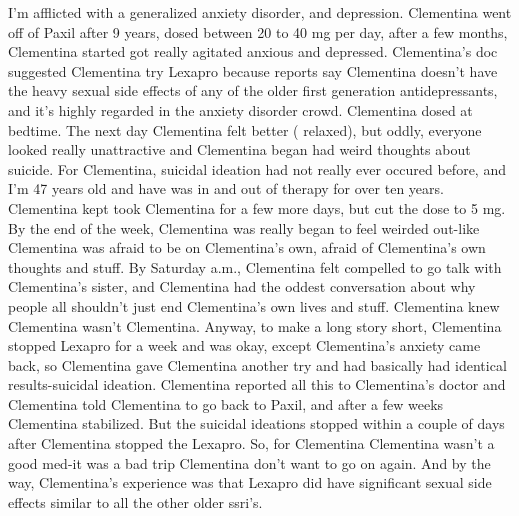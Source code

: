 \documentclass[12pt]{book}
\begin{document}
I'm afflicted with a generalized anxiety disorder, and depression. Clementina went off of Paxil after 9 years, dosed between 20 to 40 mg per day, after a few months, Clementina started got really agitated anxious and depressed. Clementina's doc suggested Clementina try Lexapro because reports say Clementina doesn't have the heavy sexual side effects of any of the older first generation antidepressants, and it's highly regarded in the anxiety disorder crowd. Clementina dosed at bedtime. The next day Clementina felt better ( relaxed), but oddly, everyone looked really unattractive and Clementina began had weird thoughts about suicide. For Clementina, suicidal ideation had not really ever occured before, and I'm 47 years old and have was in and out of therapy for over ten years. Clementina kept took Clementina for a few more days, but cut the dose to 5 mg. By the end of the week, Clementina was really began to feel weirded out-like Clementina was afraid to be on Clementina's own, afraid of Clementina's own thoughts and stuff. By Saturday a.m., Clementina felt compelled to go talk with Clementina's sister, and Clementina had the oddest conversation about why people all shouldn't just end Clementina's own lives and stuff. Clementina knew Clementina wasn't Clementina. Anyway, to make a long story short, Clementina stopped Lexapro for a week and was okay, except Clementina's anxiety came back, so Clementina gave Clementina another try and had basically had identical results-suicidal ideation. Clementina reported all this to Clementina's doctor and Clementina told Clementina to go back to Paxil, and after a few weeks Clementina stabilized. But the suicidal ideations stopped within a couple of days after Clementina stopped the Lexapro. So, for Clementina Clementina wasn't a good med-it was a bad trip Clementina don't want to go on again. And by the way, Clementina's experience was that Lexapro did have significant sexual side effects similar to all the other older ssri's.
\end{document}
